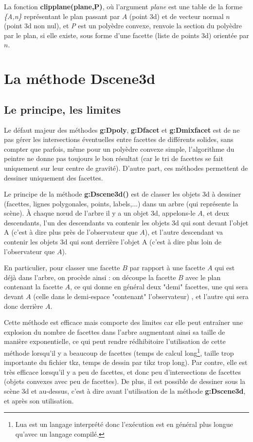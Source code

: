 La fonction \textbf{clipplane(plane,P)}, où l'argument \emph{plane} est une table de la forme \emph{\{A,n\}} représentant le plan passant par $A$ (point 3d) et de vecteur normal $n$ (point 3d non nul), et \emph{P} est un polyèdre convexe, renvoie la section du polyèdre par le plan, si elle existe, sous forme d'une facette (liste de points 3d) orientée par $n$.

\section{La méthode Dscene3d}

\subsection{Le principe, les limites}

Le défaut majeur des méthodes \textbf{g:Dpoly}, \textbf{g:Dfacet} et \textbf{g:Dmixfacet} est de ne pas gérer les intersections éventuelles entre facettes de différents solides, sans compter que parfois, même pour un polyèdre convexe simple, l'algorithme du peintre ne donne pas toujours le bon résultat (car le tri de facettes se fait uniquement sur leur centre de gravité). D'autre part, ces méthodes permettent de dessiner uniquement des facettes.

Le principe de la méthode \textbf{g:Dscene3d()} est de classer les objets 3d à dessiner (facettes, lignes polygonales, points, labels,...) dans un arbre (qui représente la scène). À chaque n{\oe}ud de l'arbre il y a un objet 3d, appelons-le $A$, et deux descendants, l'un des descendants va contenir les objets 3d qui sont devant l'objet A (c'est à dire plus près de l'observateur que $A$), et l'autre descendant va contenir les objets 3d qui sont derrière l'objet A (c'est à dire plus loin de l'observateur que $A$).

En particulier, pour classer une facette $B$ par rapport à une facette $A$ qui est déjà dans l'arbre, on procède ainsi : on découpe la facette $B$ avec le plan contenant la facette $A$, ce qui donne en général deux "demi" facettes, une qui sera devant $A$ (celle dans le demi-espace "contenant" l'observateur) , et l'autre qui sera donc derrière $A$.

Cette méthode est efficace mais comporte des limites car elle peut entraîner une explosion du nombre de facettes dans l'arbre augmentant ainsi sa taille de manière exponentielle, ce qui peut rendre rédhibitoire l'utilisation de cette méthode lorsqu'il y a beaucoup de facettes (temps de calcul long\footnote{Lua est un langage interprété donc l'exécution est en général plus longue qu'avec un langage compilé.}, taille trop importante du fichier tkz, temps de dessin par tikz trop long). Par contre, elle est très efficace lorsqu'il y a peu de facettes, et donc peu d'intersections de facettes (objets convexes avec peu de facettes). De plus, il est possible de dessiner sous la scène 3d et au-dessus, c'est à dire avant l'utilisation de la méthode \textbf{g:Dscene3d}, et après son utilisation.

